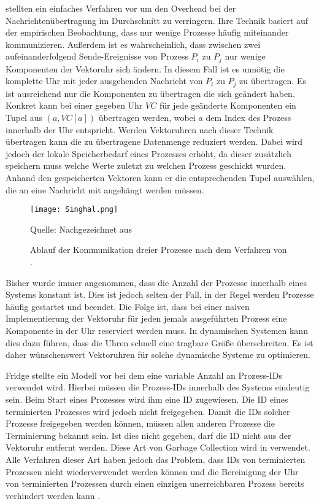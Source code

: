  \cite{singhal1992efficient} stellten ein einfaches Verfahren vor um den Overhead bei der Nachrichtenübertragung im Durchschnitt zu verringern.
Ihre Technik basiert auf der empirischen Beobachtung, dass nur wenige Prozesse häufig miteinander kommunizieren.
Außerdem ist es wahrscheinlich, dass zwischen zwei aufeinanderfolgend Sende-Ereignisse von Prozess $P_i$ zu $P_j$ nur wenige Komponenten der Vektoruhr sich ändern.
In diesem Fall ist es unnötig die komplette Uhr mit jeder ausgehenden Nachricht von $P_i$ zu $P_j$ zu übertragen.
Es ist ausreichend nur die Komponenten zu übertragen die sich geändert haben.
Konkret kann bei einer gegeben Uhr $VC$ für jede geänderte Komponenten ein Tupel aus $(a, VC[a])$ übertragen werden, wobei $a$ dem Index des Prozess innerhalb der Uhr entspricht.
Werden Vektoruhren nach dieser Technik übertragen kann die zu übertragene Datenmenge reduziert werden.
Dabei wird jedoch der lokale Speicherbedarf eines Prozesses erhöht, da dieser zusätzlich speichern muss welche Werte zuletzt zu welchen Prozess geschickt wurden.
Anhand den gespeicherten Vektoren kann er die entsprechenden Tupel auswählen, die an eine Nachricht mit angehängt werden müssen.

\begin{figure}[ht]
    \centering
    \texttt{[image: Singhal.png]}
    \caption[Kommunikaiton nach Singhal]{Ablauf der Kommunikation dreier Prozesse nach dem Verfahren von .}
    Quelle: Nachgezeichnet aus \cite{Baldoni:2002:FDC:1435723.1437765}
    \label{fig:singhal}
\end{figure}

Bisher wurde immer angenommen, dass die Anzahl der Prozesse innerhalb eines Systems konstant ist.
Dies ist jedoch selten der Fall, in der Regel werden Prozesse häufig gestartet und beendet.
Die Folge ist, dass bei einer naiven Implementierung der Vektoruhr für jeden jemals ausgeführten Prozess eine Komponente in der Uhr reserviert werden muss.
In dynamischen Systemen kann dies dazu führen, dass die Uhren schnell eine tragbare Größe überschreiten.
Es ist daher wünschenswert Vektoruhren für solche dynamische Systeme zu optimieren.

Fridge \cite{fidge1991logical} stellte ein Modell vor bei dem eine variable Anzahl an Prozess-IDs verwendet wird.
Hierbei müssen die Prozess-IDs innerhalb des Systems eindeutig sein.
Beim Start eines Prozesses wird ihm eine ID zugewiesen.
Die ID eines terminierten Prozesses wird jedoch nicht freigegeben.
Damit die IDs solcher Prozesse freigegeben werden können, müssen allen anderen Prozesse die Terminierung bekannt sein.
Ist dies nicht gegeben, darf die ID nicht aus der Vektoruhr entfernt werden.
Diese Art von Garbage Collection wird in \cite{richard1998efficient} verwendet.
Alle Verfahren dieser Art haben jedoch das Problem, dass IDs von terminierten Prozessen nicht wiederverwendet werden können und die Bereinigung der Uhr von terminierten Prozessen durch einen einzigen unerreichbaren Prozess bereits verhindert werden kann \cite{almeida2008treeclocks}.

